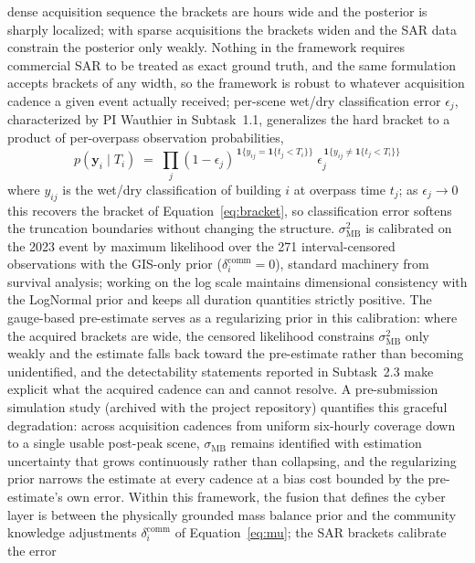 \documentclass[11pt]{article}
\begin{document}
dense acquisition sequence the brackets are hours wide and the posterior is
sharply localized; with sparse acquisitions the brackets widen and the SAR data
constrain the posterior only weakly.
Nothing in the framework requires commercial SAR to be treated as exact ground
truth, and the same formulation accepts brackets of any width, so the framework
is robust to whatever acquisition cadence a given event actually received;
per-scene wet/dry classification error $\epsilon_j$, characterized by PI Wauthier
in Subtask~1.1, generalizes the hard bracket to a product of per-overpass
observation probabilities,
\begin{equation}\label{eq:softbracket}
  p(\bm{y}_i \mid T_i) \;=\; \prod_{j}
  (1-\epsilon_j)^{\,\mathbf{1}\{y_{ij} = \mathbf{1}\{t_j < T_i\}\}}\;
  \epsilon_j^{\,\mathbf{1}\{y_{ij} \neq \mathbf{1}\{t_j < T_i\}\}}
\end{equation}
where $y_{ij}$ is the wet/dry classification of building $i$ at overpass time
$t_j$; as $\epsilon_j \to 0$ this recovers the bracket of
Equation~\eqref{eq:bracket}, so classification error softens the truncation
boundaries without changing the structure.
$\sigma_{\mathrm{MB}}^2$ is calibrated on the 2023 event by maximum likelihood
over the 271 interval-censored observations with the GIS-only prior
($\delta_i^{\mathrm{comm}} = 0$), standard machinery from survival analysis;
working on the log scale maintains dimensional consistency with the LogNormal
prior and keeps all duration quantities strictly positive.
The gauge-based pre-estimate serves as a regularizing prior in this calibration:
where the acquired brackets are wide, the censored likelihood constrains
$\sigma_{\mathrm{MB}}^2$ only weakly and the estimate falls back toward the
pre-estimate rather than becoming unidentified, and the detectability statements
reported in Subtask~2.3 make explicit what the acquired cadence can and cannot
resolve.
A pre-submission simulation study (archived with the project repository)
quantifies this graceful degradation: across acquisition cadences from uniform
six-hourly coverage down to a single usable post-peak scene,
$\sigma_{\mathrm{MB}}$ remains identified with estimation uncertainty that grows
continuously rather than collapsing, and the regularizing prior narrows the
estimate at every cadence at a bias cost bounded by the pre-estimate's own
error.
Within this framework, the fusion that defines the cyber layer is between the
physically grounded mass balance prior and the community knowledge adjustments
$\delta_i^{\mathrm{comm}}$ of Equation~\eqref{eq:mu}; the SAR brackets calibrate the error
\end{document}
